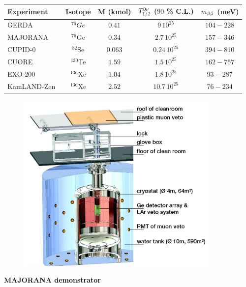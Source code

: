 \begin{center}
  \begin{table}
    \begin{tabular}{l  c  c  c  c}
      \hline \hline
      Experiment &  Isotope  & M (kmol)&$T_{1/2}^{0\nu}$ ($90$ \% C.L.)&  $m_{\beta\beta}$ (meV)\\
      \hline
      GERDA~\cite{art:GERDA2019}        & $^{76}Ge$  & $0.41$  & $9\,10^{25}$          & $104-228$    \\
      MAJORANA~\cite{art:majorana2019}  & $^{76}$Ge  & $0.34$  & $2.7\,10^{25}$        & $157-346$    \\
      CUPID-$0$~\cite{art:CUPID2018}    & $^{82}$Se  & $0.063$ & $0.24\,10^{25}$       & $394-810$    \\
      CUORE~\cite{art:CUORE2018}        & $^{130}$Te & $1.59$  & $1.5\,10^{25}$        & $162-757$    \\
      EXO-$200$~\cite{art:EXO2018}      & $^{136}$Xe & $1.04$  & $1.8\,10^{25}$        & $93-287$     \\
      KamLAND-Zen~\cite{art:KamLAND2016}& $^{136}$Xe & $2.52$  & $10.7\,10^{25}$       & $76-234$     \\
      \hline \hline
    \end{tabular}
  \end{table}
\end{center}


\begin{figure}
  \centering
  \includegraphics[width=10cm]{0nubbexperiments/fig_0nubbexperiments/GERDA.png}
  \caption{\label{fig:GERDA}}

\end{figure}


\textbf{MAJORANA demonstrator}

